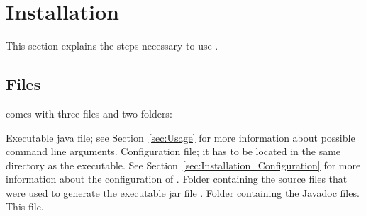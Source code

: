 \section{Installation}\label{sec:Installation}
This section explains the steps necessary to use \product{}.

\subsection{Files}\label{sec:Files}
\product{} comes with three files and two folders:
\begin{itemize}
\itemWithHead{\textnormal{\executableFile}}
Executable java file; see Section~\ref{sec:Usage} for more information about possible command line arguments.
\itemWithHead{\textnormal{\configFile}}
Configuration file; it has to be located in the same directory as the executable. See Section~\ref{sec:Installation_Configuration} for more information about the configuration of \product{}.
Folder containing the source files that were used to generate the executable jar file \executableFile.
Folder containing the Javadoc files.
\itemWithHead{\textnormal{\manualFile}}
This file.

\end{itemize}


